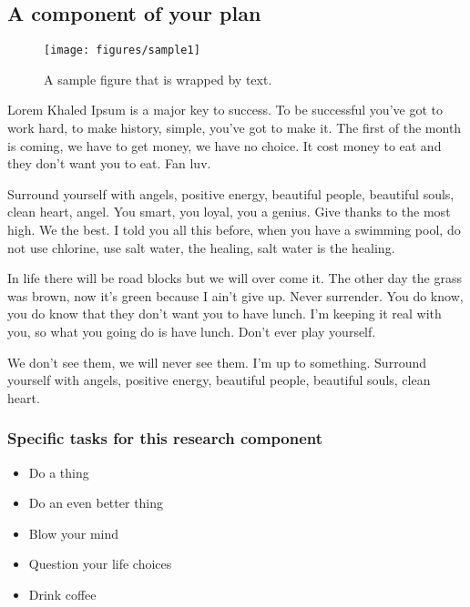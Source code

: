 \subsection{A component of your plan}

\setlength\intextsep{0pt}
\begin{wrapfigure}[20]{R}{2.4in}
 \vspace{-15pt}
 \centering
 \texttt{[image: figures/sample1]}
 \caption{A sample figure that is wrapped by text.}
 \label{fig1}
\end{wrapfigure}

Lorem Khaled Ipsum is a major key to success. To be successful you've got to work hard, to make history, simple, you've got to make it. The first of the month is coming, we have to get money, we have no choice. It cost money to eat and they don't want you to eat. Fan luv. 

Surround yourself with angels, positive energy, beautiful people, beautiful souls, clean heart, angel. You smart, you loyal, you a genius. Give thanks to the most high. We the best. I told you all this before, when you have a swimming pool, do not use chlorine, use salt water, the healing, salt water is the healing.

In life there will be road blocks but we will over come it. The other day the grass was brown, now it's green because I ain't give up. Never surrender. You do know, you do know that they don't want you to have lunch. I'm keeping it real with you, so what you going do is have lunch. Don't ever play yourself. 

We don't see them, we will never see them. I'm up to something. Surround yourself with angels, positive energy, beautiful people, beautiful souls, clean heart.


\subsubsection{Specific tasks for this research component}
\begin{itemize}
\setlength\itemsep{0em}
\item Do a thing
\item Do an even better thing
\item Blow your mind
\item Question your life choices
\item Drink coffee
\end{itemize}

